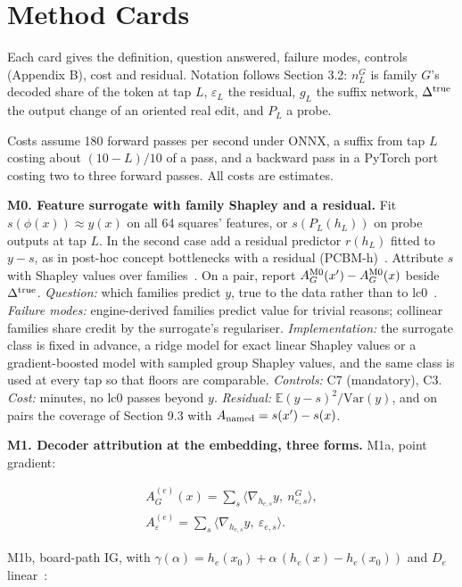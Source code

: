 \documentclass[conference]{IEEEtran}
\begin{document}
\onecolumn
\appendices
\section{Method Cards}\label{app:A}
Each card gives the definition, question answered, failure modes, controls (Appendix B), cost and residual. Notation follows Section 3.2: $n^G_L$ is family $G$'s decoded share of the token at tap $L$, $\varepsilon_L$ the residual, $g_L$ the suffix network, $\Delta^{\rm true}$ the output change of an oriented real edit, and $P_L$ a probe.

Costs assume 180 forward passes per second under ONNX, a suffix from tap $L$ costing about $(10-L)/10$ of a pass, and a backward pass in a PyTorch port costing two to three forward passes. All costs are estimates.

\textbf{M0. Feature surrogate with family Shapley and a residual.} Fit $s(\phi(x))\approx y(x)$ on all 64 squares' features, or $s(P_L(h_L))$ on probe outputs at tap $L$. In the second case add a residual predictor $r(h_L)$ fitted to $y-s$, as in post-hoc concept bottlenecks with a residual (PCBM-h)~\cite{yuksekgonul2023}. Attribute $s$ with Shapley values over families~\cite{aas2021}. On a pair, report $A^{\rm M0}_G(x')-A^{\rm M0}_G(x)$ beside $\Delta^{\rm true}$. \emph{Question:} which families predict $y$, true to the data rather than to lc0~\cite{chen2020}. \emph{Failure modes:} engine-derived families predict value for trivial reasons; collinear families share credit by the surrogate's regulariser. \emph{Implementation:} the surrogate class is fixed in advance, a ridge model for exact linear Shapley values or a gradient-boosted model with sampled group Shapley values, and the same class is used at every tap so that floors are comparable. \emph{Controls:} C7 (mandatory), C3. \emph{Cost:} minutes, no lc0 passes beyond $y$. \emph{Residual:} $\mathbb E(y-s)^2/\mathrm{Var}(y)$, and on pairs the coverage of Section 9.3 with $A_{\rm named}=s(x')-s(x)$.

\textbf{M1. Decoder attribution at the embedding, three forms.} M1a, point gradient:

\[
\begin{gathered}A^{(e)}_G(x)=\sum_s\big\langle\nabla_{h_{e,s}}y,\ n^G_{e,s}\big\rangle,\\
A^{(e)}_\varepsilon=\sum_s\big\langle\nabla_{h_{e,s}}y,\ \varepsilon_{e,s}\big\rangle.\end{gathered}
\]

M1b, board-path IG, with $\gamma(\alpha)=h_e(x_0)+\alpha\,(h_e(x)-h_e(x_0))$ and $D_e$ linear~\cite{sundararajan2017}:
\end{document}
